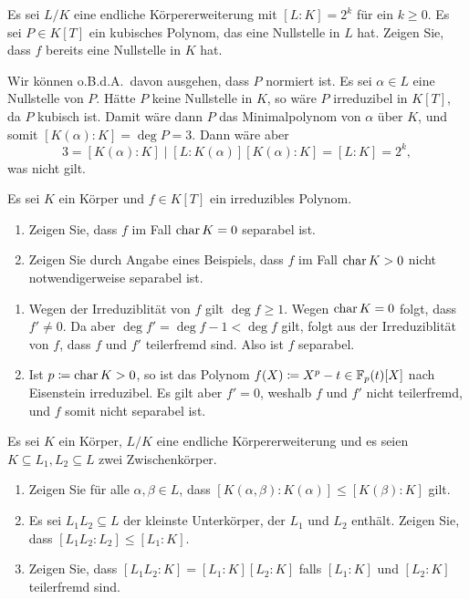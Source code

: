 \begin{question}
  Es sei $L/K$ eine endliche Körpererweiterung mit $[L : K] = 2^k$ für ein $k \geq 0$.
  Es sei $P \in K[T]$ ein kubisches Polynom, das eine Nullstelle in $L$ hat.
  Zeigen Sie, dass $f$ bereits eine Nullstelle in $K$ hat.
\end{question}


\begin{solution}
  Wir können o.B.d.A.\ davon ausgehen, dass $P$ normiert ist.
  Es sei $\alpha \in L$ eine Nullstelle von $P$.
  Hätte $P$ keine Nullstelle in $K$, so wäre $P$ irreduzibel in $K[T]$, da $P$ kubisch ist.
  Damit wäre dann $P$ das Minimalpolynom von $\alpha$ über $K$, und somit $[K(\alpha) : K] = \deg P = 3$.
  Dann wäre aber
  \[
          3
    =     [K(\alpha) : K]
    \mid  [L : K(\alpha)] [K(\alpha) : K]
    =     [L : K]
    =     2^k,
  \]
  was nicht gilt.
\end{solution}


\begin{question}
  Es sei $K$ ein Körper und $f \in K[T]$ ein irreduzibles Polynom.
  \begin{enumerate}
    \item
      Zeigen Sie, dass $f$ im Fall $\operatorname{char} K = 0$ separabel ist.
    \item
      Zeigen Sie durch Angabe eines Beispiels, dass $f$ im Fall $\operatorname{char} K > 0$ nicht notwendigerweise separabel ist.
  \end{enumerate}
\end{question}


\begin{enumerate}
  \item
    Wegen der Irreduziblität von $f$ gilt $\deg f \geq 1$.
    Wegen $\operatorname{char} K = 0$ folgt, dass $f' \neq 0$.
    Da aber $\deg f' = \deg f - 1 < \deg f$ gilt, folgt aus der Irreduziblität von $f$, dass $f$ und $f'$ teilerfremd sind.
    Also ist $f$ separabel.
  \item
    Ist $p \coloneqq \operatorname{char} K > 0$, so ist das Polynom $f(X) \coloneqq X^p - t \in \mathbb{F}_p(t)[X]$ nach Eisenstein irreduzibel.
    Es gilt aber $f' = 0$, weshalb $f$ und $f'$ nicht teilerfremd, und $f$ somit nicht separabel ist.
\end{enumerate}


\begin{question}
  Es sei $K$ ein Körper, $L/K$ eine endliche Körpererweiterung und es seien $K \subseteq L_1, L_2 \subseteq L$ zwei Zwischenkörper.
  \begin{enumerate}
    \item
      Zeigen Sie für alle $\alpha, \beta \in L$, dass $[K(\alpha, \beta) : K(\alpha)] \leq [K(\beta) : K]$ gilt.
    \item
      Es sei $L_1 L_2 \subseteq L$ der kleinste Unterkörper, der $L_1$ und $L_2$ enthält.
      Zeigen Sie, dass $[L_1 L_2 : L_2] \leq [L_1 : K]$.
    \item
      Zeigen Sie, dass $[L_1 L_2 : K] = [L_1 : K] [L_2 : K]$ falls $[L_1 : K]$ und $[L_2 : K]$ teilerfremd sind.
  \end{enumerate}
\end{question}


